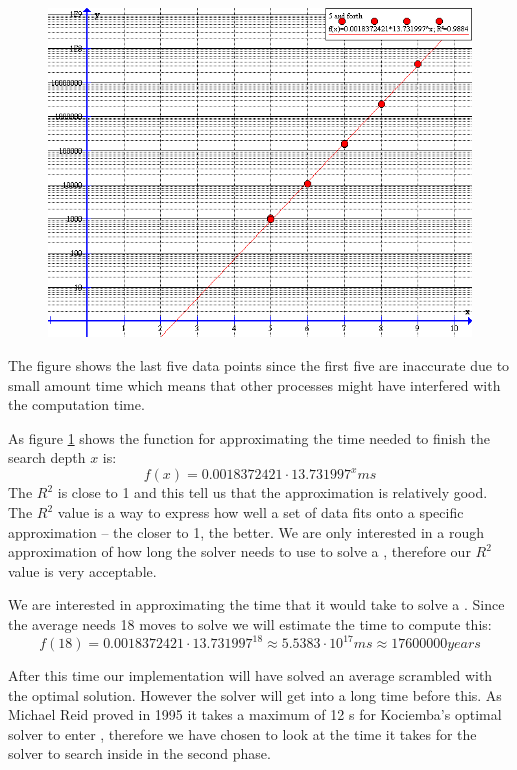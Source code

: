 \begin{figure}[htb]
	\centering
		\includegraphics[scale=0.5]{input/pics/timeFunction}
	\caption{}
	\label{fig:timeFunction}
\end{figure}

The figure shows the last five data points since the first five are inaccurate due to small amount time which means that other processes might have interfered with the computation time.

As figure \ref{fig:timeFunction} shows the function for approximating the time needed to finish the search depth $x$ is:
\[
f(x)=0.0018372421 \cdot 13.731997^{x} ms
\]
The $R^2$ is close to 1 and this tell us that the approximation is relatively good. The $R^2$ value is a way to express how well a set of data fits onto a specific approximation -- the closer to 1, the better. We are only interested in a rough approximation of how long the solver needs to use to solve a \rubik{}, therefore our $R^2$ value is very acceptable.

We are interested in approximating the time that it would take to solve a \rubik{}. Since the average \rubik{} needs 18 moves to solve \cite{kociemba09} we will estimate the time to compute this:
\[
f(18) = 0.0018372421 \cdot 13.731997^{18} \approx 5.5383 \cdot 10^{17} ms \approx 17600000 years
\]

After this time our implementation will have solved an average scrambled \rubik{} with the optimal solution.
However the solver will get into  a long time before this.
As Michael Reid proved in 1995 \cite{knowledgerush2} it takes a maximum of 12 \twist{}s for Kociemba's optimal solver to enter , therefore we have chosen to look at the time it takes for the solver to search inside  in the second phase.


